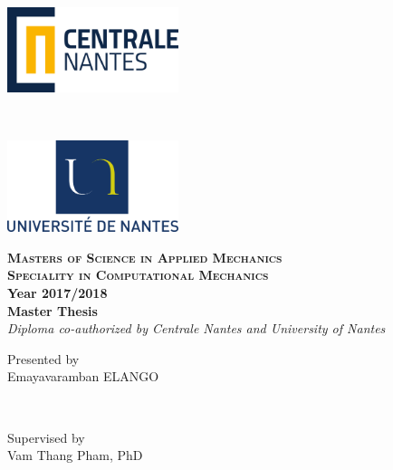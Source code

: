 \documentclass[12pt,twoside]{report}
\begin{document}








\begin{titlepage}
\begin{minipage}{0.45\textwidth}
\begin{flushleft} 
\includegraphics[width = 50mm]{images/ECN.png}
\end{flushleft}
\end{minipage}
~
\begin{minipage}{0.45\textwidth}
\begin{flushright} 
\includegraphics[width = 50mm]{images/Uni-logo.png}
\end{flushright}
\end{minipage}
\begin{center}
\vspace{2.5mm}
\textsc{\large{\textbf{Masters of Science in Applied Mechanics\\ Speciality in Computational Mechanics}}}
\\
\vspace{20mm}
{\large{\textbf{Year 2017/2018}}}\\
\vspace{10mm}
{\large{\textbf{Master Thesis}}}\\
\vspace{10mm}
\large{\textit{Diploma co-authorized by
Centrale Nantes and University of Nantes}}\\
\vspace{10mm}
\begin{minipage}{0.45\textwidth}
\begin{center}
\large{Presented by}\\
\vspace{2mm}
Emayavaramban ELANGO \\
\end{center} 
\end{minipage}
~
\begin{minipage}{0.45\textwidth}
\begin{center}
\large{Supervised by}\\
\vspace{2mm}
Vam Thang Pham, PhD \\
\end{center}
\end{minipage}


\end{center}
\end{titlepage}
\end{document}
